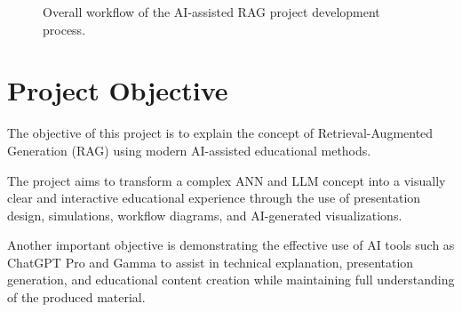 \documentclass[12pt,a4paper]{article}
\begin{document}
\begin{figure}[H]

\caption{Overall workflow of the AI-assisted RAG project development process.}

\label{fig:project_pipeline}

\end{figure}


\section{Project Objective}

The objective of this project is to explain the concept of Retrieval-Augmented Generation (RAG) using modern AI-assisted educational methods.

The project aims to transform a complex ANN and LLM concept into a visually clear and interactive educational experience through the use of presentation design, simulations, workflow diagrams, and AI-generated visualizations.

Another important objective is demonstrating the effective use of AI tools such as ChatGPT Pro and Gamma to assist in technical explanation, presentation generation, and educational content creation while maintaining full understanding of the produced material.
\end{document}
